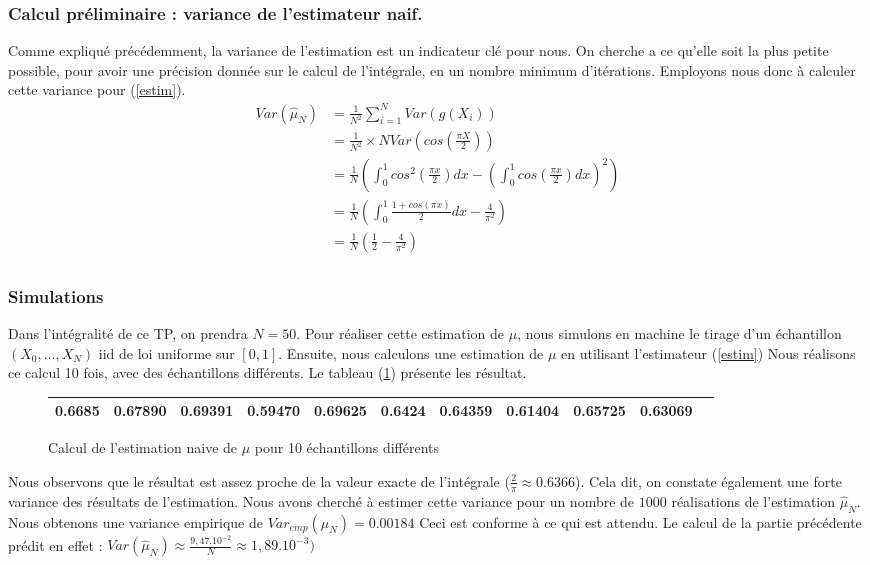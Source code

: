 \documentclass{article}
\begin{document}
\subsubsection{Calcul préliminaire : variance de l'estimateur naif.}
Comme expliqué précédemment, la variance de l'estimation 
est un indicateur clé pour nous. On cherche a ce qu'elle soit la plus petite possible, 
pour avoir une précision donnée sur le calcul de l'intégrale, en un nombre
minimum d'itérations. Employons nous donc à calculer cette variance pour (\ref{estim}). 
\begin{align*} 
   Var(\hat{\mu}_N) &= \frac1{N^2} \sum_{i=1}^N Var(g(X_i))\\ 
   &= \frac1{N^2}\times N Var(cos(\frac{\pi X}2)) \\ 
   &= \frac1{N} \left ( \int_0^1 cos^2(\frac{\pi x}2)dx - \left ( \int_0^1 cos(\frac{\pi x}2)dx \right )^2 \right )\\
   &= \frac1{N} \left ( \int_0^1 \frac{1+cos(\pi x)}{2}dx - 
    \frac4{\pi^2} \right )\\
   &= \frac1{N} \left ( \frac{1}{2} - 
    \frac4{\pi^2} \right )\\
 \end{align*}
\subsubsection{Simulations}
Dans l'intégralité de ce TP, on prendra $N=50$.
Pour réaliser cette estimation de $\mu$, nous simulons en machine
le tirage d'un échantillon $(X_{0},\textrm{...},X_{N})$ iid de loi uniforme sur $[0,1]$.
Ensuite, nous calculons une estimation de $\mu$ en utilisant l'estimateur (\ref{estim})
Nous réalisons ce calcul 10 fois, avec des échantillons différents. Le tableau (\ref{naif}) 
présente les résultat.
\begin{figure}[h!]
  \centering
  \caption{Calcul de l'estimation naive de $\mu$ pour 10 échantillons différents}
  \label{naif}
  \begin{tabular}{|*{11}{c|}}
    \hline 0.6685 & 0.67890& 0.69391& 0.59470& 0.69625&0.6424 & 0.64359& 0.61404& 0.65725& 0.63069 \\
    \hline
  \end{tabular}
\end{figure}

Nous observons que le résultat est assez proche de la valeur exacte de l'intégrale 
($\frac{2}{\pi} \approx 0.6366$). Cela dit, on constate également une forte variance des résultats de l'estimation. Nous avons cherché à 
estimer cette variance pour un nombre de $1000$ réalisations de l'estimation $\hat{\mu}_{N}$. Nous obtenons une variance empirique de $Var_{emp}(\mu_{N})=0.00184$
Ceci est conforme à ce qui est attendu. Le calcul de la partie précédente prédit en effet :  $Var(\hat{\mu}_{N})\approx \frac{9,47.10^{-2}}{N} \approx 1,89.10^{-3})$
\end{document}
